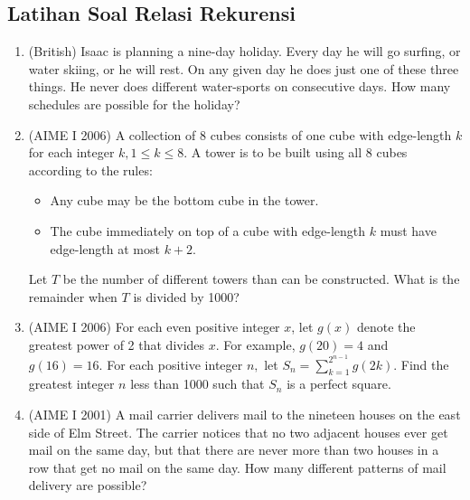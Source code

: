 \subsection{Latihan Soal Relasi Rekurensi}
\begin{enumerate}
    \item (British) Isaac is planning a nine-day holiday. Every day he will go surfing, or water skiing, or he will rest. On any given day he does just one of these three things. He never does different water-sports on consecutive days. How many schedules are possible for the holiday?

    \item (AIME I 2006) A collection of 8 cubes consists of one cube with edge-length $k$ for each integer $k, 1 \le k \le 8.$ A tower is to be built using all 8 cubes according to the rules:
    \begin{itemize}
        \item Any cube may be the bottom cube in the tower.
        \item The cube immediately on top of a cube with edge-length $k$ must have edge-length at most $k+2.$
    \end{itemize}
    Let $T$ be the number of different towers than can be constructed. What is the remainder when $T$ is divided by 1000?

    \item (AIME I 2006) For each even positive integer $x$, let $g(x)$ denote the greatest power of 2 that divides $x.$ For example, $g(20)=4$ and $g(16)=16.$ For each positive integer $n,$ let $S_n=\sum_{k=1}^{2^{n-1}}g(2k).$ Find the greatest integer $n$ less than 1000 such that $S_n$ is a perfect square.

    \item (AIME I 2001) A mail carrier delivers mail to the nineteen houses on the east side of Elm Street. The carrier notices that no two adjacent houses ever get mail on the same day, but that there are never more than two houses in a row that get no mail on the same day. How many different patterns of mail delivery are possible?
\end{enumerate}